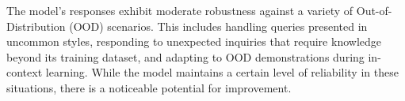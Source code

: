 The model's responses exhibit moderate robustness against a variety of Out-of-Distribution (OOD) scenarios. This includes handling queries presented in uncommon styles, responding to unexpected inquiries that require knowledge beyond its training dataset, and adapting to OOD demonstrations during in-context learning. While the model maintains a certain level of reliability in these situations, there is a noticeable potential for improvement.